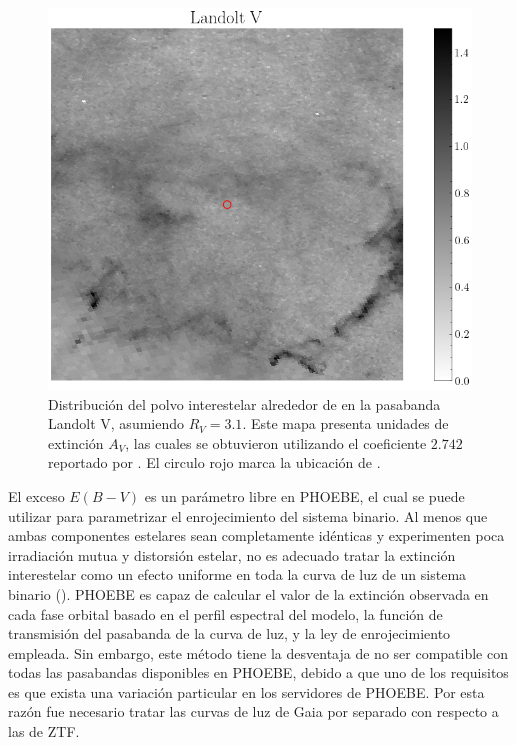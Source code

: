 \begin{figure}[!ht]
    \centering
    \includegraphics[scale=0.54]{Conclusion/Figures/Figura Mapa Polvo Landolt V.png}
    \caption{Distribución del polvo interestelar alrededor de \atoObjId en la
    pasabanda Landolt V, asumiendo $R_V = 3.1$. Este mapa presenta unidades de
    extinción $A_V$, las cuales se obtuvieron utilizando el coeficiente $2.742$
    reportado por
    . El
    circulo rojo marca la ubicación de \atoObjIdNoSpace.}
    \label{figuraMapaPolvoLandoltV}
\end{figure}

El exceso $E(B-V)$ es un parámetro libre en PHOEBE, el cual se puede utilizar
para parametrizar el enrojecimiento del sistema binario. Al menos que ambas
componentes estelares sean completamente idénticas y experimenten poca
irradiación mutua y distorsión estelar, no es adecuado tratar la extinción
interestelar como un efecto uniforme en toda la curva de luz de un sistema
binario
().
PHOEBE es capaz de calcular el valor de la extinción observada en cada fase
orbital basado en el perfil espectral del modelo, la función de transmisión del 
pasabanda de la curva de luz, y la ley de enrojecimiento empleada. Sin
embargo, este método tiene la desventaja de no ser compatible con todas las
pasabandas disponibles en PHOEBE, debido a que uno de los requisitos es que
exista una variación particular  en los servidores de PHOEBE. Por esta
razón fue necesario tratar las curvas de luz de Gaia por separado con respecto 
a las de ZTF.

